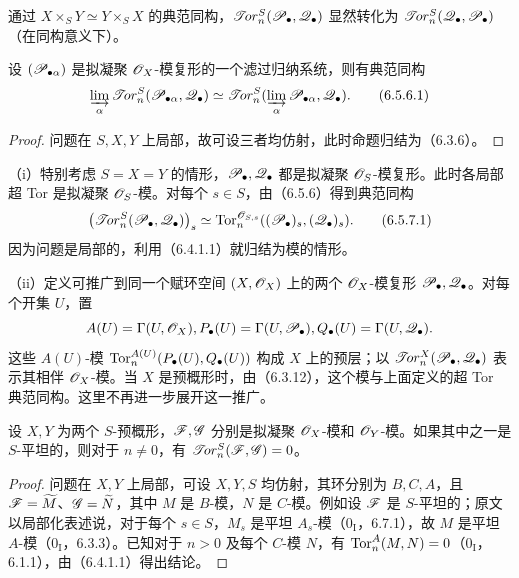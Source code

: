 通过 $X\times_S Y\simeq Y\times_S X$ 的典范同构，$\mathscr{T}\!or_n^S(\mathscr P_\bullet,\mathscr Q_\bullet)$ 显然转化为 $\mathscr{T}\!or_n^S(\mathscr Q_\bullet,\mathscr P_\bullet)$（在同构意义下）。

设 $(\mathscr P_{\bullet\alpha})$ 是拟凝聚 $\mathscr O_X$-模复形的一个滤过归纳系统，则有典范同构
\begin{equation}
 \varinjlim_\alpha\mathscr{T}\!or_n^S(\mathscr P_{\bullet\alpha},\mathscr Q_\bullet)
 \simeq\mathscr{T}\!or_n^S(\varinjlim_\alpha\mathscr P_{\bullet\alpha},\mathscr Q_\bullet).
 \tag{6.5.6.1}
\end{equation}
\begin{proof}
问题在 $S,X,Y$ 上局部，故可设三者均仿射，此时命题归结为（6.3.6）。
\end{proof}

（i）特别考虑 $S=X=Y$ 的情形，$\mathscr P_\bullet,\mathscr Q_\bullet$ 都是拟凝聚 $\mathscr O_S$-模复形。此时各局部超 Tor 是拟凝聚 $\mathscr O_S$-模。对每个 $s\in S$，由（6.5.6）得到典范同构
\begin{equation}
 \bigl(\mathscr{T}\!or_n^S(\mathscr P_\bullet,\mathscr Q_\bullet)\bigr)_s
 \simeq\operatorname{Tor}_n^{\mathscr O_{S,s}}((\mathscr P_\bullet)_s,(\mathscr Q_\bullet)_s).
 \tag{6.5.7.1}
\end{equation}
因为问题是局部的，利用（6.4.1.1）就归结为模的情形。

（ii）定义可推广到同一个赋环空间 $(X,\mathscr O_X)$ 上的两个 $\mathscr O_X$-模复形 $\mathscr P_\bullet,\mathscr Q_\bullet$。对每个开集 $U$，置
\[
 A(U)=\Gamma(U,\mathscr O_X), P_\bullet(U)=\Gamma(U,\mathscr P_\bullet),
 Q_\bullet(U)=\Gamma(U,\mathscr Q_\bullet).
\]
这些 $A(U)$-模 $\operatorname{Tor}_n^{A(U)}(P_\bullet(U),Q_\bullet(U))$ 构成 $X$ 上的预层；以 $\mathscr{T}\!or_n^X(\mathscr P_\bullet,\mathscr Q_\bullet)$ 表示其相伴 $\mathscr O_X$-模。当 $X$ 是预概形时，由（6.3.12），这个模与上面定义的超 Tor 典范同构。这里不再进一步展开这一推广。

设 $X,Y$ 为两个 $S$-预概形，$\mathscr F,\mathscr G$ 分别是拟凝聚 $\mathscr O_X$-模和 $\mathscr O_Y$-模。如果其中之一是 $S$-平坦的，则对于 $n\ne0$，有 $\mathscr{T}\!or_n^S(\mathscr F,\mathscr G)=0$。
\begin{proof}
问题在 $X,Y$ 上局部，可设 $X,Y,S$ 均仿射，其环分别为 $B,C,A$，且 $\mathscr F=\widetilde M$、$\mathscr G=\widetilde N$，其中 $M$ 是 $B$-模，$N$ 是 $C$-模。例如设 $\mathscr F$ 是 $S$-平坦的；原文以局部化表述说，对于每个 $s\in S$，$M_s$ 是平坦 $A_s$-模（$0_{\mathrm I}$，6.7.1），故 $M$ 是平坦 $A$-模（$0_{\mathrm I}$，6.3.3）。已知对于 $n>0$ 及每个 $C$-模 $N$，有 $\operatorname{Tor}_n^A(M,N)=0$（$0_{\mathrm I}$，6.1.1），由（6.4.1.1）得出结论。
\end{proof}

